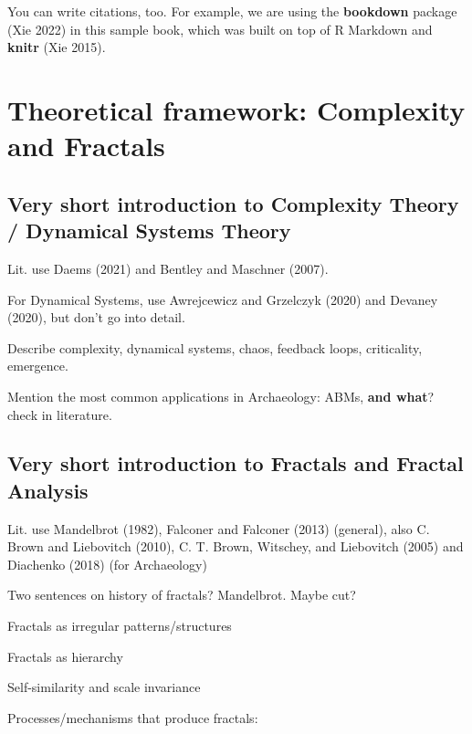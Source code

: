\documentclass[
  12pt,
]{book}
\begin{document}
You can write citations, too. For example, we are using the \textbf{bookdown} package (Xie 2022) in this sample book, which was built on top of R Markdown and \textbf{knitr} (Xie 2015).

\hypertarget{theoretical-framework-complexity-and-fractals}{%
\chapter{Theoretical framework: Complexity and Fractals}\label{theoretical-framework-complexity-and-fractals}}

\hypertarget{very-short-introduction-to-complexity-theory-dynamical-systems-theory}{%
\section{Very short introduction to Complexity Theory / Dynamical Systems Theory}\label{very-short-introduction-to-complexity-theory-dynamical-systems-theory}}

Lit. use Daems (2021) and Bentley and Maschner (2007).

For Dynamical Systems, use Awrejcewicz and Grzelczyk (2020) and Devaney (2020), but don't go into detail.

Describe complexity, dynamical systems, chaos, feedback loops, criticality, emergence.

Mention the most common applications in Archaeology: ABMs, \textbf{and what}? check in literature.

\hypertarget{very-short-introduction-to-fractals-and-fractal-analysis}{%
\section{Very short introduction to Fractals and Fractal Analysis}\label{very-short-introduction-to-fractals-and-fractal-analysis}}

Lit. use Mandelbrot (1982), Falconer and Falconer (2013) (general), also C. Brown and Liebovitch (2010), C. T. Brown, Witschey, and Liebovitch (2005) and Diachenko (2018) (for Archaeology)

Two sentences on history of fractals? Mandelbrot. Maybe cut?

Fractals as irregular patterns/structures

Fractals as hierarchy

Self-similarity and scale invariance

Processes/mechanisms that produce fractals:
\end{document}
